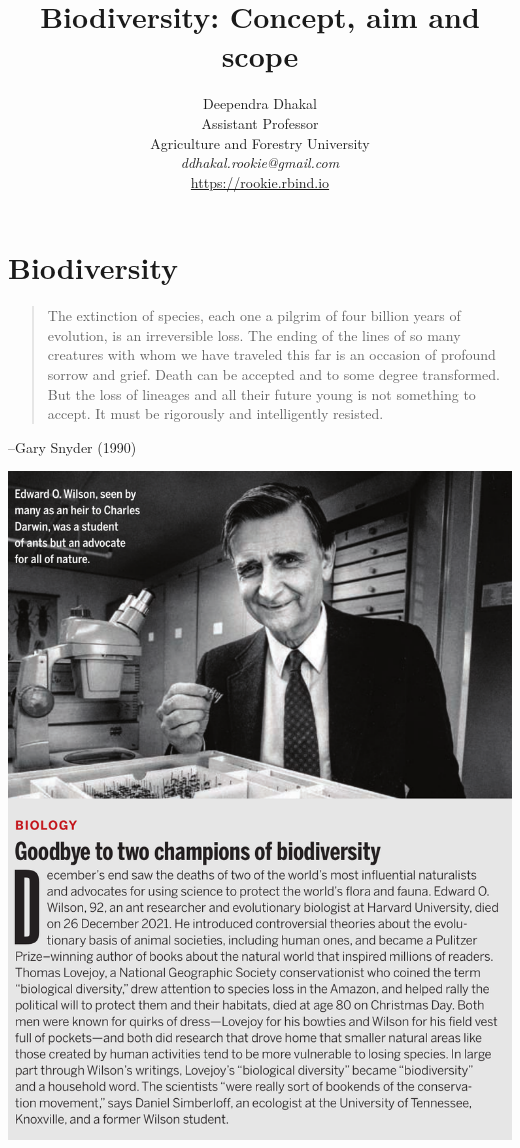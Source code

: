 \documentclass[
  ignorenonframetext,
  aspectratio=169]{beamer}
\title{Biodiversity: Concept, aim and scope}
\author{Deependra Dhakal\\
Assistant Professor\\
Agriculture and Forestry University\\
\textit{ddhakal.rookie@gmail.com}\\
\url{https://rookie.rbind.io}}
\date{}
\begin{document}
\frame{\titlepage}

\begin{frame}[allowframebreaks]
  \tableofcontents[hideallsubsections]
\end{frame}
\hypertarget{biodiversity}{%
\section{Biodiversity}\label{biodiversity}}

\begin{frame}{}
\protect\hypertarget{section}{}
\begin{quote}
The extinction of species, each one a pilgrim of four billion years of evolution, is an irreversible loss. The ending of the lines of so many creatures with whom we have traveled this far is an occasion of profound sorrow and grief. Death can be accepted and to some degree transformed. But the loss of lineages and all their future young is not something to accept. It must be rigorously and intelligently resisted.
\end{quote}
\begin{flushright} --Gary Snyder (1990) \end{flushright}
\end{frame}

\begin{frame}{}
\protect\hypertarget{section-1}{}
\begin{center}\includegraphics[width=0.44\linewidth]{../images/biodiversity_pioneers} \end{center}
\end{frame}
\end{document}
